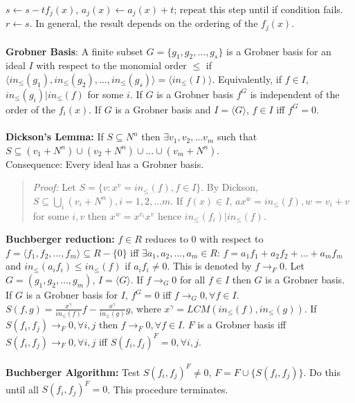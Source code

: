 $s \leftarrow s- t f_j(x)$,
$a_j(x) \leftarrow a_j(x) + t$; repeat this step until if condition fails.
$r \leftarrow s$.  In general, the result depends on the ordering of the
$f_j(x)$.  \\
\\
{\bf Grobner Basis}:  A finite subset
$G= \{ g_1 , g_2 , ..., g_s \}$ is a Grobner basis for an ideal $I$
with respect to the monomial order $\leq$ if
$\langle in_{\leq}(g_1 ), in_{\leq}(g_2 ), ... , in_{\leq}(g_s )  \rangle= 
\langle in_{\leq}(I) \rangle$.
Equivalently, if $f \in I$, $in_{\leq}(g_i ) | in_{\leq}(f)$ for some $i$.
If $G$ is a Grobner basis $f^G$ is independent of the order of the $f_i(x)$.
If $G$ is a Grobner basis and $I= \langle G \rangle$, $f \in I$ iff $f^G = 0$.
\\
\\
{\bf Dickson's Lemma:}  If $S \subseteq N^n$ then $\exists v_1, v_2, \ldots v_m$ such
that $S \subseteq (v_1 + N^n) \cup (v_2 + N^n) \cup \ldots \cup (v_m + N^n)$.
\\
Consequence: Every ideal has a Grobner basis.
\begin{quote}
\emph{Proof:} Let $S= \{v: x^v = in_{\leq}(f), f \in I \}$.  By Dickson,
$S \subseteq \bigcup_i (v_i + N^n), i= 1,2, \ldots m$. If
$f(x) \in I$,
$ax^w = in_{\leq} (f), w= v_i + v$ for some $i, v$ then
$x^w= x^{v_i}x^v$ hence $in_{\leq}(f_i) | in_{\leq}(f)$.
\end{quote}
{\bf Buchberger reduction:}
$f \in R$ reduces to 0 with respect to  
$f= \langle f_1, f_2, \ldots, f_m \rangle \subseteq R - \{0\}$
iff $\exists a_1 , a_2 , \ldots , a_m \in R$:
$f= a_1 f_1 + a_2 f_2 + \ldots + a_m f_m$ and $in_{\leq}(a_i f_i) \leq in_{\leq}(f)$
if $a_i f_i \ne 0$.  This is denoted by $f \rightarrow_F 0$.
Let $G= (g_1,g_2, \ldots, g_m)$, $I= \langle G \rangle$.  
If $f \rightarrow_G 0$ for all $f \in I$
then $G$ is a Grobner basis.  If $G$ is a Grobner basis for $I$,
$f^G=0$ iff $f \rightarrow_G 0, \forall f \in I$.
$S(f, g)= {\frac {x^{\gamma}} {in_{\leq}(f)} } f - {\frac {x^{\gamma}} {in_{\leq}(g)} } g$,
where $x^{\gamma}= LCM(in_{\leq}(f),in_{\leq}(g))$.
If $S(f_i, f_j) \rightarrow_F 0, \forall i,j$ then $f \rightarrow_F 0, \forall f \in I$.
$F$ is a Grobner basis iff $S(f_i,f_j) \rightarrow_F 0, \forall i,j$ iff
$S(f_i, f_j)^F = 0, \forall i,j$.
\\
\\
{\bf Buchberger Algorithm:}
Test $S(f_i, f_j)^F \ne 0$, $F= F \cup \{ S(f_i, f_j) \}$.  Do this
until all $S(f_i, f_j)^F=0$.  This procedure terminates.
\\
